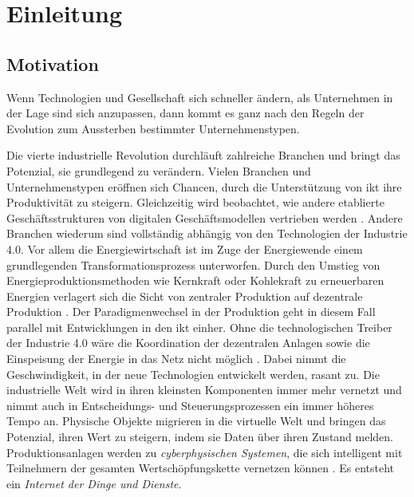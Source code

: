 \section{Einleitung}

\subsection{Motivation}

\begin{displayquote}
  \glqq Wenn Technologien und Gesellschaft sich schneller ändern, als Unternehmen in der Lage sind sich anzupassen, dann kommt es ganz nach den Regeln der Evolution zum Aussterben bestimmter Unternehmenstypen.\grqq{}
\end{displayquote}

\begin{flushright}
  \citet[S. 3, zitiert nach Land, K.-H. 2015]{Roth2016}
\end{flushright}

\noindent Die vierte industrielle Revolution durchläuft zahlreiche Branchen und bringt das Potenzial, sie grundlegend zu verändern. Vielen Branchen und Unternehmenstypen eröffnen sich Chancen, durch die Unterstützung von \ac{ikt} ihre Produktivität zu steigern. Gleichzeitig wird beobachtet, wie andere etablierte Geschäftsstrukturen von digitalen Geschäftsmodellen vertrieben werden \citep{Lauenroth2016}. Andere Branchen wiederum sind vollständig abhängig von den Technologien der Industrie 4.0. Vor allem die Energiewirtschaft ist im Zuge der Energiewende einem grundlegenden Transformationsprozess unterworfen. Durch den Umstieg von Energieproduktionsmethoden wie Kernkraft oder Kohlekraft zu erneuerbaren Energien verlagert sich die Sicht von zentraler Produktion auf dezentrale Produktion \citep{Doleski2015}. Der Paradigmenwechsel in der Produktion geht in diesem Fall parallel mit Entwicklungen in den \ac{ikt} einher. Ohne die technologischen Treiber der Industrie 4.0 wäre die Koordination der dezentralen Anlagen sowie die Einspeisung der Energie in das Netz nicht möglich \citep{Utecht2018}. Dabei nimmt die Geschwindigkeit, in der neue Technologien entwickelt werden, rasant zu. Die industrielle Welt wird in ihren kleinsten Komponenten immer mehr vernetzt und nimmt auch in Entscheidungs- und Steuerungsprozessen ein immer höheres Tempo an. Physische Objekte migrieren in die virtuelle Welt und bringen das Potenzial, ihren Wert zu steigern, indem sie Daten über ihren Zustand melden. Produktionsanlagen werden zu \textit{cyberphysischen Systemen}, die sich intelligent mit Teilnehmern der gesamten Wertschöpfungskette vernetzen können \citep{Lauenroth2016}. Es entsteht ein \textit{Internet der Dinge und Dienste}. 

